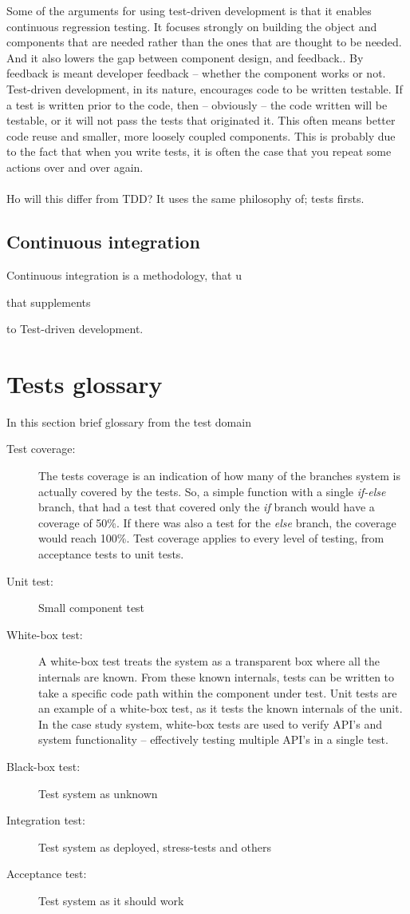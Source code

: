 Some of the arguments for using test-driven development is that it enables continuous regression testing. It focuses strongly on building the object and components that are needed rather than the ones that are thought to be needed. And it also lowers the gap between component design, and feedback.\cite{george2003}. By feedback is meant developer feedback -- whether the component works or not.\\
Test-driven development, in its nature, encourages code to be written testable. If a test is written prior to the code, then -- obviously -- the code written will be testable, or it will not pass the tests that originated it. This often means better code reuse and smaller, more loosely coupled components. This is probably due to the fact that when you write tests, it is often the case that you repeat some actions over and over again.\\\\ %
Ho will this differ from TDD? It uses the same philosophy of; tests firsts.

\subsection{Continuous integration}
Continuous integration is a methodology, that u

 that supplements

 to Test-driven development.


\section{Tests glossary}
In this section brief glossary from the test domain
\begin{description}
  \item[Test coverage:] The tests coverage is an indication of how many of the branches system is actually covered by the tests. So, a simple function with a single \emph{if-else} branch, that had a test that covered only the \emph{if} branch would have a coverage of 50\%. If there was also a test for the \emph{else} branch, the coverage would reach 100\%. Test coverage applies to every level of testing, from acceptance tests to unit tests.
  \item[Unit test:] Small component test
  \item[White-box test:] A white-box test treats the system as a transparent box where all the internals are known. From these known internals, tests can be written to take a specific code path within the component under test. Unit tests are an example of a white-box test, as it tests the known internals of the unit. In the case study system, white-box tests are used to verify API's and system functionality -- effectively testing multiple API's in a single test.
  \item[Black-box test:] Test system as unknown
  \item[Integration test:] Test system as deployed, stress-tests and others
  \item[Acceptance test:] Test system as it should work
\end{description}


